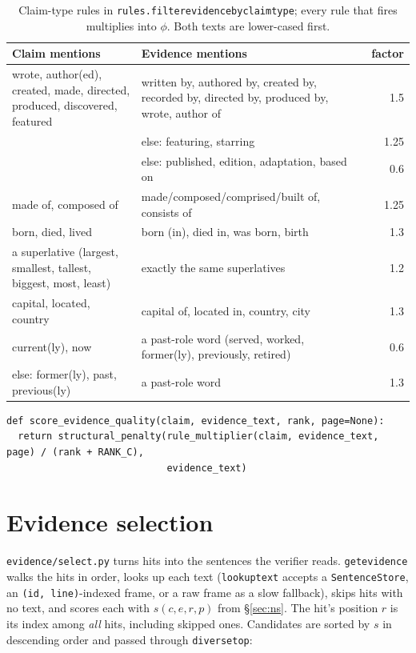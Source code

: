 \documentclass[11pt,a4paper]{article}
\makeatletter
\DeclareRobustCommand{\_}{\ifmmode\nfss@text{\textunderscore}\else\textunderscore\allowbreak\fi}
\newcommand{\file}[1]{\texttt{#1}}
\makeatother
\begin{document}
\begin{table}[ht]
\centering\small
\begin{tabular}{@{}p{4.3cm}p{6.6cm}r@{}}
\toprule
Claim mentions & Evidence mentions & factor \\
\midrule
wrote, author(ed), created, made, directed, produced, discovered, featured
  & written by, authored by, created by, recorded by, directed by, produced by, wrote, author of & 1.5 \\
  & else: featuring, starring & 1.25 \\
  & else: published, edition, adaptation, based on & 0.6 \\
made of, composed of & made/composed/comprised/built of, consists of & 1.25 \\
born, died, lived & born (in), died in, was born, birth & 1.3 \\
a superlative (largest, smallest, tallest, biggest, most, least) & exactly the same superlatives & 1.2 \\
capital, located, country & capital of, located in, country, city & 1.3 \\
current(ly), now & a past-role word (served, worked, former(ly), previously, retired) & 0.6 \\
else: former(ly), past, previous(ly) & a past-role word & 1.3 \\
\bottomrule
\end{tabular}
\caption{Claim-type rules in \texttt{rules.filter\_evidence\_by\_claim\_type}; every rule that fires multiplies into
$\phi$. Both texts are lower-cased first.}
\label{tab:rules}
\end{table}

\begin{lstlisting}
def score_evidence_quality(claim, evidence_text, rank, page=None):
  return structural_penalty(rule_multiplier(claim, evidence_text, page) / (rank + RANK_C),
                            evidence_text)
\end{lstlisting}

\section{Evidence selection}

\file{evidence/select.py} turns hits into the sentences the verifier reads. \texttt{get\_evidence} walks the hits in
order, looks up each text (\texttt{\_lookup\_text} accepts a \texttt{SentenceStore}, an \texttt{(id, line)}-indexed
frame, or a raw frame as a slow fallback), skips hits with no text, and scores each with $s(c,e,r,p)$ from
\S\ref{sec:ns}. The hit's position $r$ is its index among \emph{all} hits, including skipped ones. Candidates are
sorted by $s$ in descending order and passed through \texttt{\_diverse\_top}:
\end{document}
